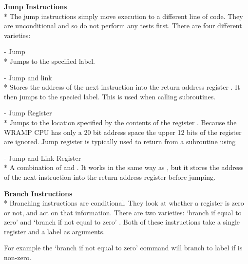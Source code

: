 \textbf{Jump Instructions}\\*
The jump instructions simply move execution to a different line of
code. They are unconditional and so do not perform any tests first.
There are four different varieties:

 - Jump\\*
Jumps to the specified label.

 - Jump and link\\*
Stores the address of the next instruction into the return address register . It then jumps to the specied label. This is used when calling subroutines.

 - Jump Register\\*
Jumps to the location specified by the contents of the register \regs.
Because the WRAMP CPU has only a 20 bit address space the upper 12 bits
of the register are ignored. Jump register is typically used to
return from a subroutine using 

 - Jump and Link Register\\* 
A combination of  and . 
It works in the same way as , but it stores the address of the
next instruction into the return address register before jumping.

\textbf{Branch Instructions}\\*
Branching instructions are conditional. They look at whether a
register is zero or not, and act on that information. There are two
varieties: `branch if equal to zero'  and `branch if not
equal to zero' . Both of these instructions take a single
register and a label as arguments.

For example the `branch if not equal to zero' command
 will branch to label  if
 is non-zero.

\begin{comment}
\subsection{I/O Routines}

In the example program you will see we have used the routines
\src{putstr}, \src{readnum} and \src{writenum} to perfrom input
and output. These routines are in the file \LIBEXTWO, which we will 
\BI{link} to. Here is an overview of the routines:
\begin{description}
\item[\src{putstr}] is used to write a string to the Linux machine. Put the
address of the string into register \reg{2}.
\item[\src{readnum}] reads a number from the Linux machine, leaving it in
register \reg{1}.
\item[\src{writenum}] will write the number in register \reg{2} to the 
Linux machine.
\end{description}
\end{comment}

